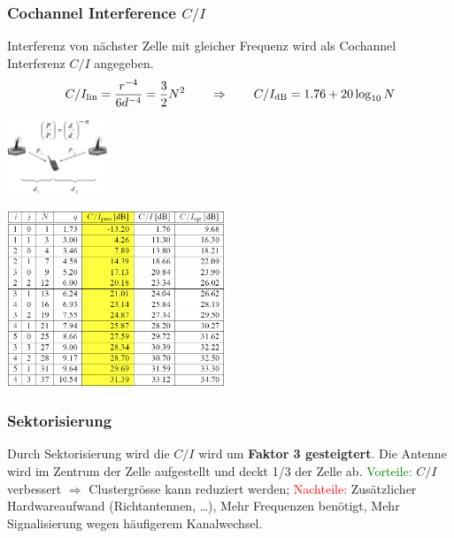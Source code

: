 \subsubsection{Cochannel Interference $C/I$ }
    \begin{minipage}{12.5cm}
        Interferenz von nächster Zelle mit gleicher Frequenz wird als Cochannel Interferenz $C/I$ angegeben.
        $$ C/I_{\text{lin}} = \frac{r^{-4}}{6d^{-4}} = \frac32 N^2 \qquad \Rightarrow \qquad 
        C/I_{\text{dB}} = 1.76 + 20 \log_{10} N $$
        \begin{center}
            \includegraphics[width=3cm]{./bilder/systems-ci.png}                
        \end{center}
    \end{minipage}
    \begin{minipage}{6.5cm}
        \includegraphics[width=6.5cm]{./bilder/systems-gsm-CItable.png}    
    \end{minipage}

\subsubsection{Sektorisierung }
	Durch Sektorisierung wird die $C/I$ wird um \textbf{Faktor 3 gesteigtert}. Die Antenne wird im Zentrum der Zelle
	aufgestellt und deckt 1/3 der Zelle ab. \textcolor{green}{Vorteile:} $C/I$ verbessert $\Rightarrow$ Clustergrösse kann reduziert werden;
	\textcolor{red}{Nachteile:} Zusätzlicher Hardwareaufwand (Richtantennen, \ldots), Mehr Frequenzen benötigt, Mehr Signalisierung wegen häufigerem Kanalwechsel.

